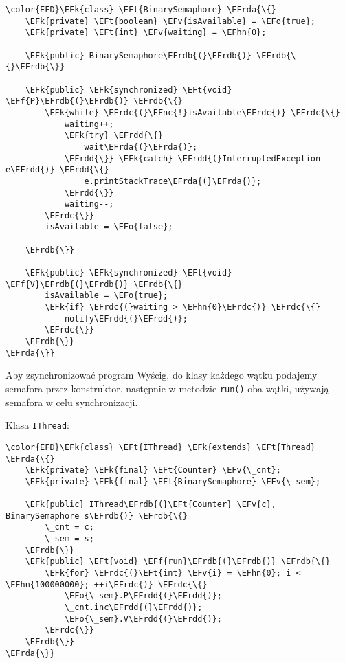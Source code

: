 \documentclass[11pt]{article}
\newcommand{\EFk}[1]{\textcolor{EFk}{#1}} %
\newcommand{\EFf}[1]{\textcolor{EFf}{#1}} %
\newcommand{\EFv}[1]{\textcolor{EFv}{#1}} %
\newcommand{\EFt}[1]{\textcolor{EFt}{#1}} %
\newcommand{\EFo}[1]{\textcolor{EFo}{#1}} %
\newcommand{\EFnc}[1]{\textcolor{EFnc}{\textbf{#1}}} %
\newcommand{\EFhn}[1]{\textcolor{EFhn}{#1}} %
\newcommand{\EFrda}[1]{#1} %
\newcommand{\EFrdb}[1]{\textcolor{EFrdb}{#1}} %
\newcommand{\EFrdc}[1]{\textcolor{EFrdc}{#1}} %
\newcommand{\EFrdd}[1]{\textcolor{EFrdd}{#1}} %
\begin{document}
\begin{Code}
\begin{Verbatim}
\color{EFD}\EFk{class} \EFt{BinarySemaphore} \EFrda{\{}
    \EFk{private} \EFt{boolean} \EFv{isAvailable} = \EFo{true};
    \EFk{private} \EFt{int} \EFv{waiting} = \EFhn{0};

    \EFk{public} BinarySemaphore\EFrdb{(}\EFrdb{)} \EFrdb{\{}\EFrdb{\}}

    \EFk{public} \EFk{synchronized} \EFt{void} \EFf{P}\EFrdb{(}\EFrdb{)} \EFrdb{\{}
        \EFk{while} \EFrdc{(}\EFnc{!}isAvailable\EFrdc{)} \EFrdc{\{}
            waiting++;
            \EFk{try} \EFrdd{\{}
                wait\EFrda{(}\EFrda{)};
            \EFrdd{\}} \EFk{catch} \EFrdd{(}InterruptedException e\EFrdd{)} \EFrdd{\{}
                e.printStackTrace\EFrda{(}\EFrda{)};
            \EFrdd{\}}
            waiting--;
        \EFrdc{\}}
        isAvailable = \EFo{false};

    \EFrdb{\}}

    \EFk{public} \EFk{synchronized} \EFt{void} \EFf{V}\EFrdb{(}\EFrdb{)} \EFrdb{\{}
        isAvailable = \EFo{true};
        \EFk{if} \EFrdc{(}waiting > \EFhn{0}\EFrdc{)} \EFrdc{\{}
            notify\EFrdd{(}\EFrdd{)};
        \EFrdc{\}}
    \EFrdb{\}}
\EFrda{\}}
\end{Verbatim}
\end{Code}

Aby zsynchronizować program Wyścig, do klasy każdego wątku podajemy semafora przez
konstruktor, następnie w metodzie \texttt{run()} oba wątki, używają semafora w celu
synchronizacji.

Klasa \texttt{IThread}:
\begin{Code}
\begin{Verbatim}
\color{EFD}\EFk{class} \EFt{IThread} \EFk{extends} \EFt{Thread} \EFrda{\{}
    \EFk{private} \EFk{final} \EFt{Counter} \EFv{\_cnt};
    \EFk{private} \EFk{final} \EFt{BinarySemaphore} \EFv{\_sem};

    \EFk{public} IThread\EFrdb{(}\EFt{Counter} \EFv{c}, BinarySemaphore s\EFrdb{)} \EFrdb{\{}
        \_cnt = c;
        \_sem = s;
    \EFrdb{\}}
    \EFk{public} \EFt{void} \EFf{run}\EFrdb{(}\EFrdb{)} \EFrdb{\{}
        \EFk{for} \EFrdc{(}\EFt{int} \EFv{i} = \EFhn{0}; i < \EFhn{100000000}; ++i\EFrdc{)} \EFrdc{\{}
            \EFo{\_sem}.P\EFrdd{(}\EFrdd{)};
            \_cnt.inc\EFrdd{(}\EFrdd{)};
            \EFo{\_sem}.V\EFrdd{(}\EFrdd{)};
        \EFrdc{\}}
    \EFrdb{\}}
\EFrda{\}}
\end{Verbatim}
\end{Code}
\end{document}
